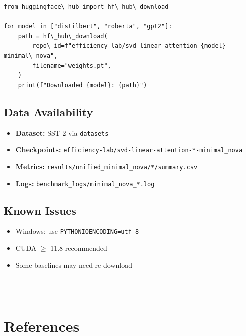 \begin{lstlisting}
from huggingface\_hub import hf\_hub\_download

for model in ["distilbert", "roberta", "gpt2"]:
    path = hf\_hub\_download(
        repo\_id=f"efficiency-lab/svd-linear-attention-{model}-minimal\_nova",
        filename="weights.pt",
    )
    print(f"Downloaded {model}: {path}")
\end{lstlisting}

\subsection{Data Availability}

\begin{itemize}
\item \textbf{Dataset:} SST-2 via \texttt{datasets}
\item \textbf{Checkpoints:} \texttt{efficiency-lab/svd-linear-attention-*-minimal\_nova}
\item \textbf{Metrics:} \texttt{results/unified\_minimal\_nova/*/summary.csv}
\item \textbf{Logs:} \texttt{benchmark\_logs/minimal\_nova\_*.log}

\end{itemize}
\subsection{Known Issues}

\begin{itemize}
\item Windows: use \texttt{PYTHONIOENCODING=utf-8}
\item CUDA $\ge$ 11.8 recommended
\item Some baselines may need re-download
\end{itemize}
\begin{lstlisting}

---
\end{lstlisting}


\section{References}

